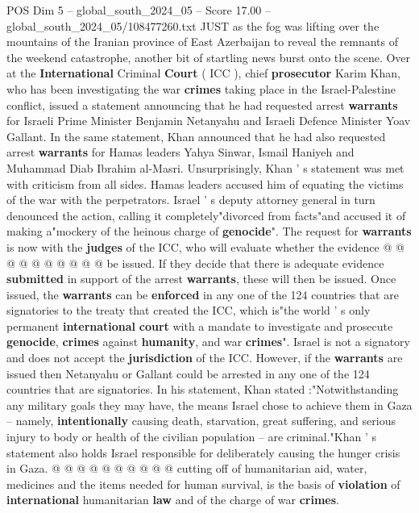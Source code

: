 \begin{textsample}{POS Dim 5 – global\_south\_2024\_05 – Score 17.00 – global\_south\_2024\_05/108477260.txt}  \label{ex:f5_pos_073}
JUST as the fog was lifting over the mountains of the Iranian province of East Azerbaijan to reveal the remnants of the weekend catastrophe, another bit of startling news burst onto the scene.
Over at the \textbf{International} Criminal \textbf{Court} ( ICC ), chief \textbf{prosecutor} Karim Khan, who has been investigating the war \textbf{crimes} taking place in the Israel-Palestine conflict, issued a statement announcing that he had requested arrest \textbf{warrants} for Israeli Prime Minister Benjamin Netanyahu and Israeli Defence Minister Yoav Gallant.
In the same statement, Khan announced that he had also requested arrest \textbf{warrants} for Hamas leaders Yahya Sinwar, Ismail Haniyeh and Muhammad Diab Ibrahim al-Masri.
Unsurprisingly, Khan ' s statement was met with criticism from all sides.
Hamas leaders accused him of equating the victims of the war with the perpetrators.
Israel ' s deputy attorney general in turn denounced the action, calling it completely"divorced from facts"and accused it of making a"mockery of the heinous charge of \textbf{genocide}".
The request for \textbf{warrants} is now with the \textbf{judges} of the ICC, who will evaluate whether the evidence @ @ @ @ @ @ @ @ @ @ be issued.
If they decide that there is adequate evidence \textbf{submitted} in support of the arrest \textbf{warrants}, these will then be issued.
Once issued, the \textbf{warrants} can be \textbf{enforced} in any one of the 124 countries that are signatories to the treaty that created the ICC, which is"the world ' s only permanent \textbf{international} \textbf{court} with a mandate to investigate and prosecute \textbf{genocide}, \textbf{crimes} against \textbf{humanity}, and war \textbf{crimes}".
Israel is not a signatory and does not accept the \textbf{jurisdiction} of the ICC.
However, if the \textbf{warrants} are issued then Netanyahu or Gallant could be arrested in any one of the 124 countries that are signatories.
In his statement, Khan stated :"Notwithstanding any military goals they may have, the means Israel chose to achieve them in Gaza -- namely, \textbf{intentionally} causing death, starvation, great suffering, and serious injury to body or health of the civilian population -- are criminal."Khan ' s statement also holds Israel responsible for deliberately causing the hunger crisis in Gaza. @ @ @ @ @ @ @ @ @ @ cutting off of humanitarian aid, water, medicines and the items needed for human survival, is the basis of \textbf{violation} of \textbf{international} humanitarian \textbf{law} and of the charge of war \textbf{crimes}.

\end{textsample}
